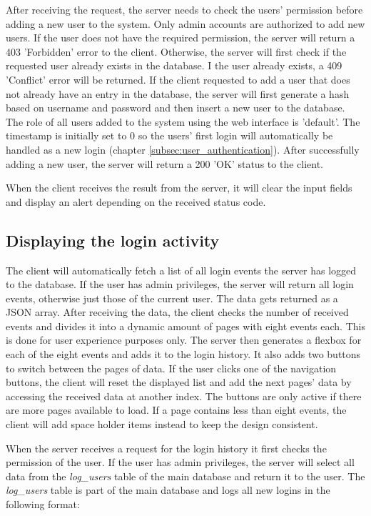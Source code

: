 After receiving the request, the server needs to check the users' permission before adding a new user to the system. Only admin accounts are authorized to add new users. If the user does not have the required permission, the server will return a 403 'Forbidden' error to the client. Otherwise, the server will first check if the requested user already exists in the database.  I the user already exists, a 409 'Conflict' error will be returned. If the client requested to add a user that does not already have an entry in the database,  the server will first generate a hash based on username and password and then insert a new user to the database. The role of all users added to the system using the web interface is 'default'. The timestamp is initially set to 0 so the users' first login will automatically be handled as a new login (chapter \ref{subsec:user_authentication}). After successfully adding a new user, the server will return a 200 'OK' status to the client.

When the client receives the result from the server, it will clear the input fields and display an alert depending on the received status code.



\subsection{Displaying the login activity}
\label{subsec:displaying_the_login_activity}

The client will automatically fetch a list of all login events the server has logged to the database. If the user has admin privileges, the server will return all login events, otherwise just those of the current user. The data gets returned as a JSON array.
After receiving the data, the client checks the number of received events and divides it into a dynamic amount of pages with eight events each. This is done for user experience purposes only. The server then generates a flexbox for each of the eight events and adds it to the login history. It also adds two buttons to switch between the pages of data.
If the user clicks one of the navigation buttons, the client will reset the displayed list and add the next pages' data by accessing the received data at another index.  The buttons are only active if there are more pages available to load.
If a page contains less than eight events, the client will add space holder items instead to keep the design consistent.

When the server receives a request for the login history it first checks the permission of the user. If the user has admin privileges, the server will select all data from the \textit{log\_users} table of the main database and return it to the user.  The \textit{log\_users} table is part of the main database and logs all new logins in the following format:

